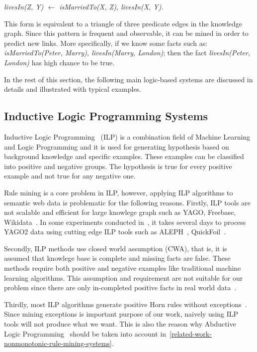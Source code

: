 \centerline{\textit{livesIn(Z, Y) $\leftarrow$ isMarriedTo(X, Z), livesIn(X, Y).}}

This form is equivalent to a triangle of three predicate edges in the knowledge graph. Since this pattern is frequent and observable, it can be mined in order to predict new links. More specifically, if we know some facts such as: \textit{isMarriedTo(Peter, Marry), livesIn(Marry, London)}; then the fact \textit{livesIn(Peter, London)} has high chance to be true.

In the rest of this section, the following main logic-based systems are discussed in details and illustrated with typical examples.

\subsection{Inductive Logic Programming Systems}

Inductive Logic Programming~\cite{ref9} (ILP) is a combination field of Machine Learning and Logic Programming and it is used for generating hypothesis based on background knowledge and specific examples. These examples can be classified into positive and negative groups. The hypothesis is true for every positive example and not true for any negative one.

Rule mining is a core problem in ILP, however, applying ILP algorithms to semantic web data is problematic for the following reasons. Firstly, ILP tools are not scalable and efficient for large knowlege graph such as YAGO, Freebase, Wikidata~\cite{ref10}. In some experiments conducted in~\cite{ref10}, it takes several days to process YAGO2 data using cutting edge ILP tools such as ALEPH~\cite{ref14, ref10}, QuickFoil~\cite{ref15, ref10}.

Secondly, ILP methods use closed world assumption (CWA), that is, it is assumed that knowlege base is complete and missing facts are false. These methods require both positive and negative examples like traditional machine learning algorithms. This assumption and requirement are not suitable for our problem since there are only in-completed positive facts in real world data~\cite{ref10}.

Thirdly, most ILP algorithms generate positive Horn rules without exceptions~\cite{ref11}. Since mining exceptions is important purpose of our work, naively using ILP tools will not produce what we want. This is also the reason why Abductive Logic Programming~\cite{ref11} should be taken into account in~\ref{related-work-nonmonotonic-rule-mining-systems}.	

